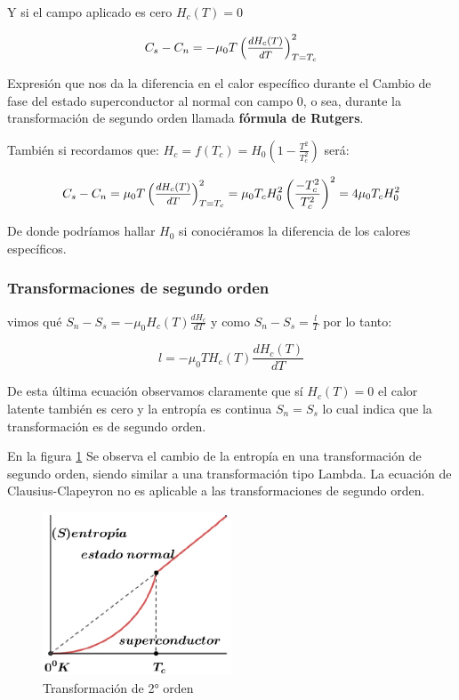 Y si el campo aplicado es cero $H_{c}(T)=0$

\begin{equation}
C_{s}-C_{n}=-\mu_{0}T\left( \mfrac{dH_{c}(T)}{dT} \right)^{2}_{T=T_{c}}  
\end{equation}



Expresión que nos da la diferencia en el calor específico durante el Cambio de fase del estado superconductor al normal con campo 0, o sea, durante la transformación de segundo orden llamada \textbf{fórmula de Rutgers}.

También si recordamos que: $H_{c}=f(T_{c})=H_{0}\left(1-\frac{T^{2}}{T_{c}^{2}} \right)$ será:

\begin{equation}
C_{s}-C_{n}=\mu_{0}T\left( \mfrac{dH_{c}(T)}{dT} \right)^{2}_{T=T_{c}} =
 \mu_{0}T_{c}H_{0}^{2}\left( \frac{-T_{c}^{2}}{T_{c}^{2}} \right)^{2}= 4\mu_{0}T_{c}H_{0}^{2} 
\end{equation}

De donde podríamos hallar $H_{0}$ si conociéramos la diferencia de los calores específicos.

\subsubsection{Transformaciones de segundo orden}

vimos qué $S_{n}-S_{s}= -\mu_{0}H_{c}(T)\frac{dH_{c}}{dT}$ y como $S_{n}-S_{s}=\frac{l}{T}$ por lo tanto:

\begin{equation}
l= -\mu_{0}TH_{c}(T)\frac{dH_{c}(T)}{dT} 
\end{equation}

De esta última ecuación observamos claramente que sí $H_{c}(T)=0$ el calor latente también es cero y la entropía es continua $S_{n}=S_{s}$ lo cual indica que la transformación es de segundo orden.

En la figura \ref{fig:427} Se observa el cambio de la entropía en una transformación de segundo orden, siendo similar a una transformación tipo Lambda. La ecuación de Clausius-Clapeyron no es aplicable a las transformaciones de segundo orden.

\begin{figure}[H]
    \centering
    \includegraphics[width=0.5\textwidth]{./Figures/fig427}
	\caption{Transformación de 2° orden}
	\label{fig:427}
\end{figure}

